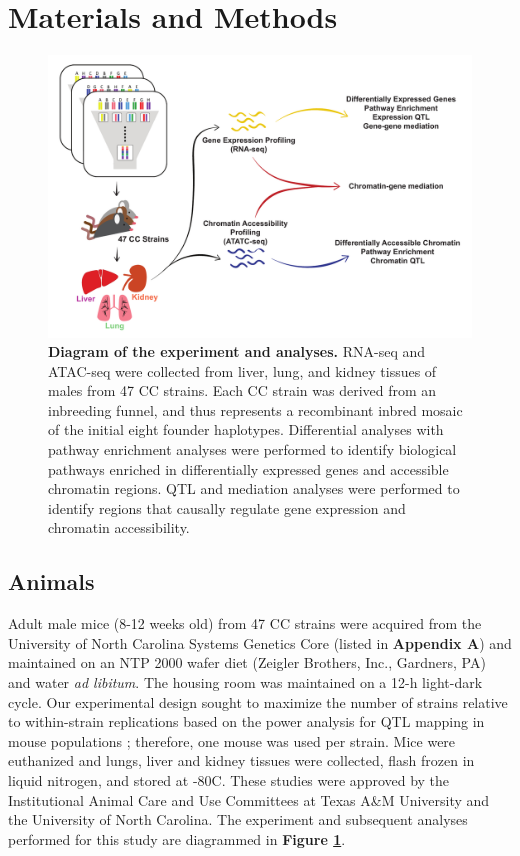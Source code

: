 \documentclass[9pt,twocolumn,twoside]{gsajnl}
\begin{document}
\section{Materials and Methods}
\label{sec:materials:methods}

\begin{figure}[htbp]
\renewcommand{\familydefault}{\sfdefault}\normalfont
\centering
\includegraphics[width=0.8\linewidth, clip, trim={0in 0.1in 0in 0.2in}]{figs/overview_diagram_simplified.pdf}
\caption{\textbf{Diagram of the experiment and analyses.} RNA-seq and ATAC-seq were collected from liver, lung, and kidney tissues of males from 47 CC strains. Each CC strain was derived from an inbreeding funnel, and thus represents a recombinant inbred mosaic of the initial eight founder haplotypes. Differential analyses with pathway enrichment analyses were performed to identify biological pathways enriched in differentially expressed genes and accessible chromatin regions. QTL and mediation analyses were performed to identify regions that causally regulate gene expression and chromatin accessibility.
\label{fig:overview}}
\end{figure}

\subsection{Animals}

Adult male mice (8-12 weeks old) from 47 CC strains were acquired from the University of North Carolina Systems Genetics Core (listed in \textbf{Appendix A}) and maintained on an NTP 2000 wafer diet (Zeigler Brothers, Inc., Gardners, PA) and water \textit{ad libitum}. The housing room was maintained on a 12-h light-dark cycle. Our experimental design sought to maximize the number of strains relative to within-strain replications based on the power analysis for QTL mapping in mouse populations \citep{Kaeppler1997}; therefore, one mouse was used per strain. Mice were euthanized and lungs, liver and kidney tissues were collected, flash frozen in liquid nitrogen, and stored at -80\degree C. These studies were approved by the Institutional Animal Care and Use Committees at Texas A\&M University and the University of North Carolina. The experiment and subsequent analyses performed for this study are diagrammed in \textbf{Figure \ref{fig:overview}}.
\end{document}
